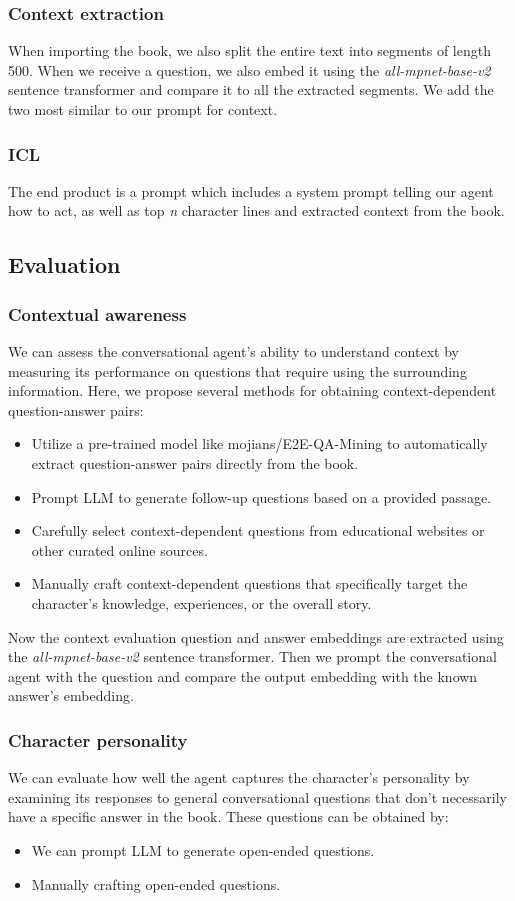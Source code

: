 \documentclass[fleqn,moreauthors,10pt]{ds_report}
\begin{document}
\subsubsection*{Context extraction}
When importing the book, we also split the entire text into segments of length 500. When we receive a question, we also embed it using the \textit{all-mpnet-base-v2} sentence transformer and compare it to all the extracted segments. We add the two most similar to our prompt for context.
\subsubsection*{ICL}
The end product is a prompt which includes a system prompt telling our agent how to act, as well as top \textit{n} character lines and extracted context from the book.
\subsection{Evaluation}
\subsubsection*{Contextual awareness}
We can assess the conversational agent's ability to understand context by measuring its performance on questions that require using the surrounding information. Here, we propose several methods for obtaining context-dependent question-answer pairs:
\begin{itemize}
    \item Utilize a pre-trained model like mojians/E2E-QA-Mining to automatically extract question-answer pairs directly from the book. 
    \item Prompt LLM to generate follow-up questions based on a provided passage.
    \item Carefully select context-dependent questions from educational websites or other curated online sources.
    \item Manually craft context-dependent questions that specifically target the character's knowledge, experiences, or the overall story.
\end{itemize}
Now the context evaluation question and answer embeddings are extracted using the \textit{all-mpnet-base-v2} sentence transformer. Then we prompt the conversational agent with the question and compare the output embedding with the known answer's embedding.

\subsubsection*{Character personality}
We can evaluate how well the agent captures the character's personality by examining its responses to general conversational questions that don't necessarily have a specific answer in the book. These questions can be obtained by:
\begin{itemize}
    \item We can prompt LLM to generate open-ended questions.
    \item Manually crafting open-ended questions.
\end{itemize}
\end{document}
